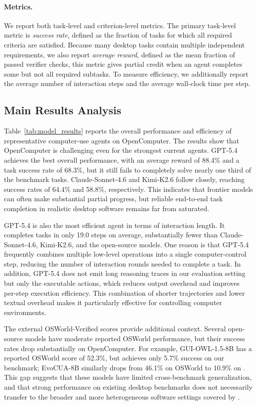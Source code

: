 \paragraph{Metrics.}
We report both task-level and criterion-level metrics. The primary task-level metric is \emph{success
rate}, defined as the fraction of tasks for which all required criteria are satisfied. Because many desktop
tasks contain multiple independent requirements, we also report \emph{average reward}, defined as
the mean fraction of passed verifier checks, this metric gives partial credit when an agent completes some but not all required subtasks. To measure
efficiency, we additionally report the average number of interaction steps and the average wall-clock
time per step.


\subsection{Main Results Analysis}

Table~\ref{tab:model_results} reports the overall performance and efficiency of representative 
computer-use agents on OpenComputer. The results show that OpenComputer is challenging even
for the strongest current agents. GPT-5.4 achieves the best overall performance, with an average
reward of 88.4\% and a task success rate of 68.3\%, but it still fails to completely solve nearly one
third of the benchmark tasks. Claude-Sonnet-4.6 and Kimi-K2.6 follow closely, reaching success
rates of 64.4\% and 58.8\%, respectively. This indicates that frontier models can often make
substantial partial progress, but reliable end-to-end task completion in realistic desktop software
remains far from saturated.

GPT-5.4 is also the most efficient agent in terms of interaction length. It completes tasks in only
19.0 steps on average, substantially fewer than Claude-Sonnet-4.6, Kimi-K2.6, and the open-source
models. One reason is that GPT-5.4 frequently combines multiple low-level operations into a single
computer-control step, reducing the number of interaction rounds needed to complete a task. In
addition, GPT-5.4 does not emit long reasoning traces in our evaluation setting but only the executable actions, which reduces output overhead and improves per-step execution efficiency. This combination of shorter trajectories
and lower textual overhead makes it particularly effective for controlling computer environments.

The external OSWorld-Verified scores provide additional context. Several open-source models have moderate reported OSWorld performance, but their success rates drop substantially on OpenComputer.
For example, GUI-OWL-1.5-8B has a reported OSWorld score of 52.3\%, but achieves only 5.7\%
success on our benchmark; EvoCUA-8B similarly drops from 46.1\% on OSWorld to 10.9\% on
\ours. This gap suggests that these models have limited cross-benchmark generalization,
and that strong performance on existing desktop benchmarks does not necessarily transfer to the
broader and more heterogeneous software settings covered by \ours.

